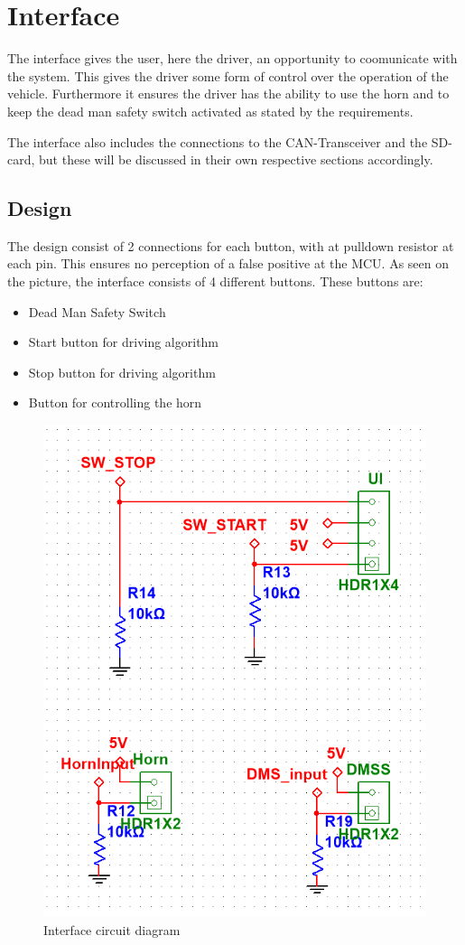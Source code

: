 \newpage
\section{Interface}
The interface gives the user, here the driver,  an opportunity to coomunicate with the system. This gives the driver some form of control over the operation of the vehicle. Furthermore it ensures the driver has the ability to use the horn and to keep the dead man safety switch activated as stated by the requirements.

The interface also includes the connections to the CAN-Transceiver and the SD-card, but these will be discussed in their own respective sections accordingly.
  
\subsection{Design}
The design consist of 2 connections for each button, with at pulldown resistor at each pin. This ensures no perception of a false positive at the MCU. As seen on the picture, the interface consists of 4 different buttons. These buttons are:

\begin{itemize}
	\item{Dead Man Safety Switch}
	\item{Start button for driving algorithm}
	\item{Stop button for driving algorithm}
	\item{Button for controlling the horn}
\end{itemize}

\begin{figure}[H]
	\centering
	\includegraphics[width=0.6\linewidth]{Hardware/Pictures/User_interface}
	\caption{Interface circuit diagram}
	\label{fig:interface}
\end{figure}

